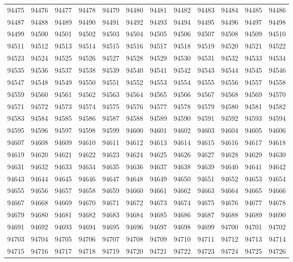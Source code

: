 \begin{center}
\begin{longtable}{llllllllllll}
94475 &94476 &94477 &94478 &94479 &94480 &94481 &94482 &94483 &94484 &94485 &94486 \\
94487 &94488 &94489 &94490 &94491 &94492 &94493 &94494 &94495 &94496 &94497 &94498 \\
94499 &94500 &94501 &94502 &94503 &94504 &94505 &94506 &94507 &94508 &94509 &94510 \\
94511 &94512 &94513 &94514 &94515 &94516 &94517 &94518 &94519 &94520 &94521 &94522 \\
94523 &94524 &94525 &94526 &94527 &94528 &94529 &94530 &94531 &94532 &94533 &94534 \\
94535 &94536 &94537 &94538 &94539 &94540 &94541 &94542 &94543 &94544 &94545 &94546 \\
94547 &94548 &94549 &94550 &94551 &94552 &94553 &94554 &94555 &94556 &94557 &94558 \\
94559 &94560 &94561 &94562 &94563 &94564 &94565 &94566 &94567 &94568 &94569 &94570 \\
94571 &94572 &94573 &94574 &94575 &94576 &94577 &94578 &94579 &94580 &94581 &94582 \\
94583 &94584 &94585 &94586 &94587 &94588 &94589 &94590 &94591 &94592 &94593 &94594 \\
94595 &94596 &94597 &94598 &94599 &94600 &94601 &94602 &94603 &94604 &94605 &94606 \\
94607 &94608 &94609 &94610 &94611 &94612 &94613 &94614 &94615 &94616 &94617 &94618 \\
94619 &94620 &94621 &94622 &94623 &94624 &94625 &94626 &94627 &94628 &94629 &94630 \\
94631 &94632 &94633 &94634 &94635 &94636 &94637 &94638 &94639 &94640 &94641 &94642 \\
94643 &94644 &94645 &94646 &94647 &94648 &94649 &94650 &94651 &94652 &94653 &94654 \\
94655 &94656 &94657 &94658 &94659 &94660 &94661 &94662 &94663 &94664 &94665 &94666 \\
94667 &94668 &94669 &94670 &94671 &94672 &94673 &94674 &94675 &94676 &94677 &94678 \\
94679 &94680 &94681 &94682 &94683 &94684 &94685 &94686 &94687 &94688 &94689 &94690 \\
94691 &94692 &94693 &94694 &94695 &94696 &94697 &94698 &94699 &94700 &94701 &94702 \\
94703 &94704 &94705 &94706 &94707 &94708 &94709 &94710 &94711 &94712 &94713 &94714 \\
94715 &94716 &94717 &94718 &94719 &94720 &94721 &94722 &94723 &94724 &94725 &94726 \\

\end{longtable}
\end{center}
